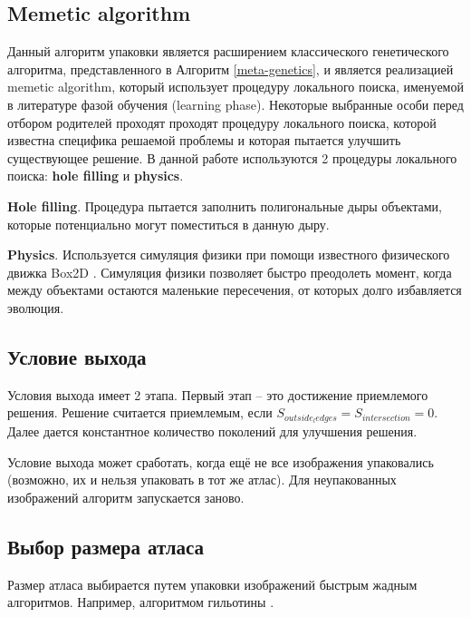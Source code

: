 \documentclass{fefu_thesis/cls/fefu}
\newcommand*\talgref[1]{Алгоритм \ref{#1}}
\begin{document}
    \subsection{Memetic algorithm}
    Данный алгоритм упаковки является расширением классического генетического алгоритма, представленного в \talgref{meta-genetics}, и является реализацией memetic algorithm, который использует процедуру локального поиска, именуемой в литературе фазой обучения (learning phase). Некоторые выбранные особи перед отбором родителей проходят проходят процедуру локального поиска, которой известна специфика решаемой проблемы и которая пытается улучшить существующее решение. В данной работе используются 2 процедуры локального поиска: \textbf{hole filling} и \textbf{physics}.

    \textbf{Hole filling}. Процедура пытается заполнить полигональные дыры объектами, которые потенциально могут поместиться в данную дыру.

    \textbf{Physics}. Используется симуляция физики при помощи известного физического движка Box2D \cite{Box2D}. Симуляция физики позволяет быстро преодолеть момент, когда между объектами остаются маленькие пересечения, от которых долго избавляется эволюция.

    \subsection{Условие выхода}
    Условия выхода имеет 2 этапа. Первый этап -- это достижение приемлемого решения. Решение считается приемлемым, если $S_{outside_ledges} = S_{intersection} = 0$. Далее дается константное количество поколений для улучшения решения.

    Условие выхода может сработать, когда ещё не все изображения упаковались (возможно, их и нельзя упаковать в тот же атлас). Для неупакованных изображений алгоритм запускается заново.

    \subsection{Выбор размера атласа}
    Размер атласа выбирается путем упаковки изображений быстрым жадным алгоритмов. Например, алгоритмом гильотины \cite{ThousandWayToPackBin}.
    \newpage
    \printbibliography
\end{document}
